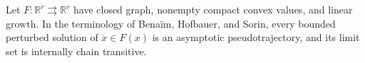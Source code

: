 Let \(F:\mathbb R^r\rightrightarrows\mathbb R^r\) have closed graph, nonempty compact convex values, and linear growth. In the terminology of Bena\"im, Hofbauer, and Sorin, every bounded perturbed solution of \(\dot x\in F(x)\) is an asymptotic pseudotrajectory, and its limit set is internally chain transitive.